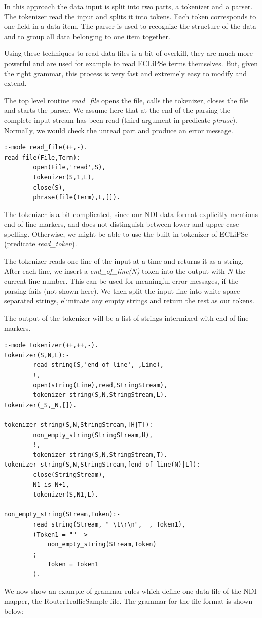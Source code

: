 \documentclass[a4paper,12pt]{report}
\begin{document}
In this approach the data input is split into two parts, a tokenizer and a parser. The tokenizer read the input and splits it into tokens. Each token corresponds to one field in a data item. The parser is used to recognize the structure of the data and to group all data belonging to one item together.

Using these techniques to read data files is a bit of overkill, they are much more powerful and are used for example to read ECLiPSe terms themselves. But, given the right grammar, this process is very fast and extremely easy to modify and extend.

The top level routine {\it read\_file} opens the file, calls the tokenizer, closes the file and starts the parser. We assume here that at the end of the parsing the complete input stream has been read (third argument in predicate {\it phrase}). Normally, we would check the unread part and produce an error message.
\begin{verbatim}
:-mode read_file(++,-).
read_file(File,Term):-
        open(File,'read',S),
        tokenizer(S,1,L),
        close(S),
        phrase(file(Term),L,[]).
\end{verbatim}

The tokenizer is a bit complicated, since our NDI data format explicitly mentions end-of-line markers, and does not distinguish between lower and upper case spelling. Otherwise, we might be able to use the built-in tokenizer of ECLiPSe (predicate {\it read\_token}).

The tokenizer reads one line of the input at a time and returns it as a string. After each line, we insert a {\it end\_of\_line(N)} token into the output with $N$ the current line number. This can be used for meaningful error messages, if the parsing fails (not shown here). We then split the input line into white space separated strings, eliminate any empty strings and return the rest as our tokens.

The output of the tokenizer will be a list of strings intermixed with end-of-line markers.
\begin{verbatim}
:-mode tokenizer(++,++,-).
tokenizer(S,N,L):-
        read_string(S,'end_of_line',_,Line),
        !,
        open(string(Line),read,StringStream),
        tokenizer_string(S,N,StringStream,L).
tokenizer(_S,_N,[]).

tokenizer_string(S,N,StringStream,[H|T]):-
        non_empty_string(StringStream,H),
        !,
        tokenizer_string(S,N,StringStream,T).
tokenizer_string(S,N,StringStream,[end_of_line(N)|L]):-
        close(StringStream),
        N1 is N+1,
        tokenizer(S,N1,L).

non_empty_string(Stream,Token):-
        read_string(Stream, " \t\r\n", _, Token1),
        (Token1 = "" ->
            non_empty_string(Stream,Token)
        ;
            Token = Token1
        ).
\end{verbatim}
We now show an example of grammar rules which define one data file of the NDI mapper, the RouterTrafficSample file. The grammar for the file format is shown below:
\end{document}
